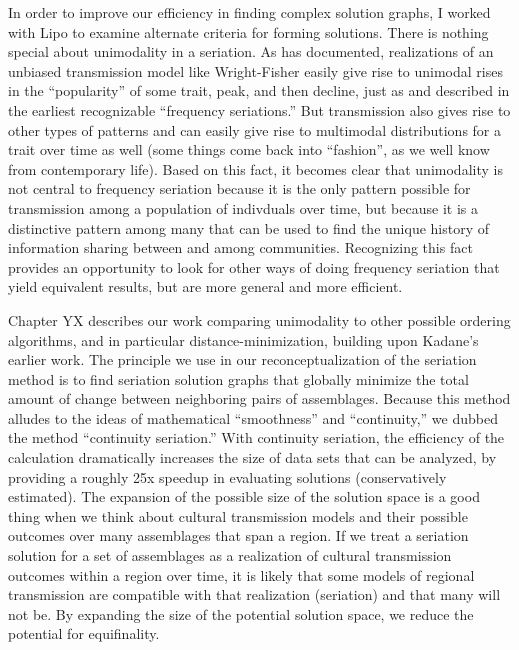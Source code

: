 In order to improve our efficiency in finding complex solution graphs, I worked with Lipo to examine alternate criteria for forming solutions. There is nothing special about unimodality in a seriation. As \citet{Neiman1990,Neiman1995}  has documented, realizations of an unbiased transmission model like Wright-Fisher easily give rise to unimodal rises in the “popularity” of some trait, peak, and then decline, just as \citet{Nelson1916} and \citet{wissler1916application} described in the earliest recognizable “frequency seriations.” But transmission also gives rise to other types of patterns and can easily give rise to multimodal distributions for a trait over time as well (some things come back into “fashion”, as we well know from contemporary life). Based on this fact, it becomes clear that unimodality is not central to frequency seriation because it is the only pattern possible for transmission among a population of indivduals over time, but because it is a distinctive pattern among many that can be used to find the unique history of information sharing between and among communities. Recognizing this fact provides an opportunity to look for other ways of doing frequency seriation that yield equivalent results, but are more general and more efficient.

Chapter YX describes our work comparing unimodality to other possible ordering algorithms, and in particular distance-minimization, building upon Kadane's \citeyearpar{Kadane1971} earlier work.  The principle we use in our reconceptualization of the seriation method is to find seriation solution graphs that globally minimize the total amount of change between neighboring pairs of assemblages. Because this method alludes to the ideas of mathematical “smoothness” and “continuity,” we dubbed the method “continuity seriation.” With continuity seriation, the efficiency of the calculation dramatically increases the size of data sets that can be analyzed, by providing a roughly 25x speedup in evaluating solutions (conservatively estimated). The expansion of the possible size of the solution space is a good thing when we think about cultural transmission models and their possible outcomes over many assemblages that span a region. If we treat a seriation solution for a set of assemblages as a realization of cultural transmission outcomes within a region over time, it is likely that some models of regional transmission are compatible with that realization (seriation) and that many will not be. By expanding the size of the potential solution space, we reduce the potential for equifinality.  

